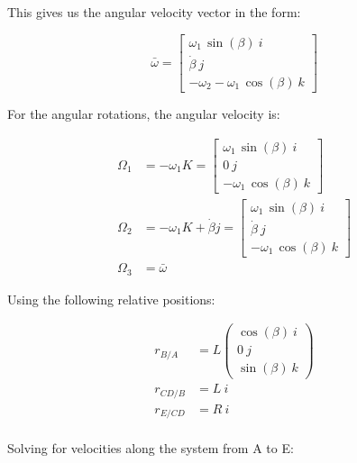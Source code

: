\documentclass[12pt, letterpaper]{../assignment}
\begin{document}
This gives us the angular velocity vector in the form:

$$ \bar{\omega} = \left[\begin{array}{r} \omega _{1}\,\sin\left(\beta \right) \ i \\ \dot{\beta } \ j \\ -\omega _{2}-\omega _{1}\,\cos\left(\beta \right) \ k  \end{array}\right] $$

For the angular rotations, the angular velocity is:

\begin{equation*}
\begin{aligned}
\Omega_1 &= -\omega_1 K= \left[\begin{array}{r} \omega _{1}\,\sin\left(\beta \right) \ i \\ 0 \ j \\ -\omega _{1}\,\cos\left(\beta \right) \ k  \end{array}\right]\\
\Omega_2 &= -\omega_1 K+ \dot{\beta} j = \left[\begin{array}{r} \omega _{1}\,\sin\left(\beta \right) \ i \\ \dot{\beta } \ j \\ -\omega _{1}\,\cos\left(\beta \right) \ k  \end{array}\right]\\
\Omega_3 &= \bar{\omega}
\end{aligned}
\end{equation*}

Using the following relative positions:

\begin{equation*}
    \begin{aligned}
        r_{B/A} &= L\left(\begin{array}{c} \cos\left(\beta \right)\ i\\ 0 \ j\\ \sin\left(\beta \right) \ k \end{array}\right)\\
        r_{CD/B} &= L\ i\\
        r_{E/CD} &= R\ i\\
    \end{aligned}
\end{equation*}
    
Solving for velocities along the system from A to E:
\end{document}

